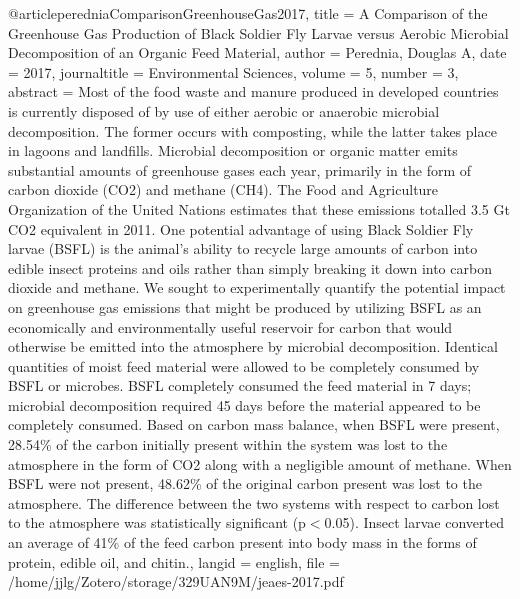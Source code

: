 {{{{@article{peredniaComparisonGreenhouseGas2017,
  title = {A {{Comparison}} of the {{Greenhouse Gas Production}} of {{Black Soldier Fly Larvae}} versus {{Aerobic Microbial Decomposition}} of an {{Organic Feed Material}}},
  author = {Perednia, Douglas A},
  date = {2017},
  journaltitle = {Environmental Sciences},
  volume = {5},
  number = {3},
  abstract = {Most of the food waste and manure produced in developed countries is currently disposed of by use of either aerobic or anaerobic microbial decomposition. The former occurs with composting, while the latter takes place in lagoons and landfills. Microbial decomposition or organic matter emits substantial amounts of greenhouse gases each year, primarily in the form of carbon dioxide (CO2) and methane (CH4). The Food and Agriculture Organization of the United Nations estimates that these emissions totalled 3.5 Gt CO2 equivalent in 2011. One potential advantage of using Black Soldier Fly larvae (BSFL) is the animal’s ability to recycle large amounts of carbon into edible insect proteins and oils rather than simply breaking it down into carbon dioxide and methane. We sought to experimentally quantify the potential impact on greenhouse gas emissions that might be produced by utilizing BSFL as an economically and environmentally useful reservoir for carbon that would otherwise be emitted into the atmosphere by microbial decomposition. Identical quantities of moist feed material were allowed to be completely consumed by BSFL or microbes. BSFL completely consumed the feed material in 7 days; microbial decomposition required 45 days before the material appeared to be completely consumed. Based on carbon mass balance, when BSFL were present, 28.54\% of the carbon initially present within the system was lost to the atmosphere in the form of CO2 along with a negligible amount of methane. When BSFL were not present, 48.62\% of the original carbon present was lost to the atmosphere. The difference between the two systems with respect to carbon lost to the atmosphere was statistically significant (p{$<$}0.05). Insect larvae converted an average of 41\% of the feed carbon present into body mass in the forms of protein, edible oil, and chitin.},
  langid = {english},
  file = {/home/jjlg/Zotero/storage/329UAN9M/jeaes-2017.pdf}
}

}}}}
